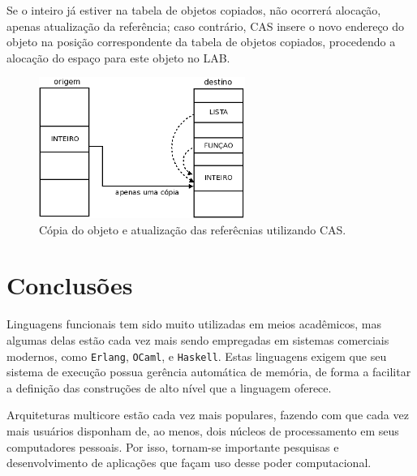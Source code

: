 \documentclass[ccc, pg2]{esinucpel}
\begin{document}
Se o inteiro já estiver na tabela de objetos copiados, não ocorrerá alocação, apenas atualização da referência; caso contrário, CAS insere o novo endereço do objeto na posição correspondente da tabela de objetos copiados, procedendo a alocação do espaço para este objeto no LAB.

\begin{figure}[h]
\centering
\includegraphics[width=0.6\textwidth]{images/CAS2.png}
\caption{Cópia do objeto e atualização das referêcnias utilizando CAS.}
\label{fig:cas2}
\end{figure}


\chapter{Conclusões} \label{sec:finalizing}
Linguagens funcionais tem sido muito utilizadas em meios acadêmicos, mas algumas delas estão cada vez mais sendo empregadas em sistemas comerciais modernos, como {\tt Erlang}, {\tt OCaml}, e {\tt Haskell}. Estas linguagens exigem que seu sistema de execução possua gerência automática de memória, de forma a facilitar a definição das construções de alto nível que a linguagem oferece.

Arquiteturas multicore estão cada vez mais populares, fazendo com que cada vez mais usuários disponham de, ao menos, dois núcleos de processamento em seus computadores pessoais. Por isso, tornam-se importante pesquisas e desenvolvimento de aplicações que façam uso desse poder computacional. %
\end{document}
